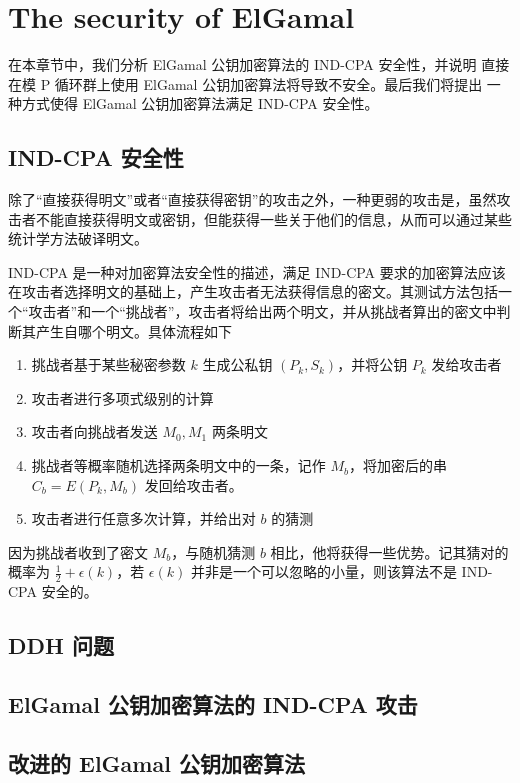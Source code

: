 \section{The security of ElGamal}

在本章节中，我们分析 ElGamal 公钥加密算法的 IND-CPA 安全性，并说明
直接在模 P 循环群上使用 ElGamal 公钥加密算法将导致不安全。最后我们将提出
一种方式使得 ElGamal 公钥加密算法满足 IND-CPA 安全性。

\subsection{IND-CPA 安全性}

除了“直接获得明文”或者“直接获得密钥”的攻击之外，一种更弱的攻击是，虽然攻击者不能直接获得明文或密钥，但能获得一些关于他们的信息，从而可以通过某些统计学方法破译明文。

IND-CPA 是一种对加密算法安全性的描述，满足 IND-CPA 要求的加密算法应该在攻击者选择明文的基础上，产生攻击者无法获得信息的密文。其测试方法包括一个“攻击者”和一个“挑战者”，攻击者将给出两个明文，并从挑战者算出的密文中判断其产生自哪个明文。具体流程如下

\begin{enumerate}
	\item 挑战者基于某些秘密参数 $k$ 生成公私钥 $(P_k, S_k)$，并将公钥 $P_k$ 发给攻击者
	\item 攻击者进行多项式级别的计算
	\item 攻击者向挑战者发送 $M_0, M_1$ 两条明文
	\item 挑战者等概率随机选择两条明文中的一条，记作 $M_b$，将加密后的串 $C_b=E(P_k, M_b)$ 发回给攻击者。
	\item 攻击者进行任意多次计算，并给出对 $b$ 的猜测
\end{enumerate}

因为挑战者收到了密文 $M_b$，与随机猜测 $b$ 相比，他将获得一些优势。记其猜对的概率为 $\frac{1}{2} + \epsilon(k)$，若 $\epsilon(k)$ 并非是一个可以忽略的小量，则该算法不是 IND-CPA 安全的。

\subsection{DDH 问题}



\subsection{ElGamal 公钥加密算法的 IND-CPA 攻击}

\subsection{改进的 ElGamal 公钥加密算法}
